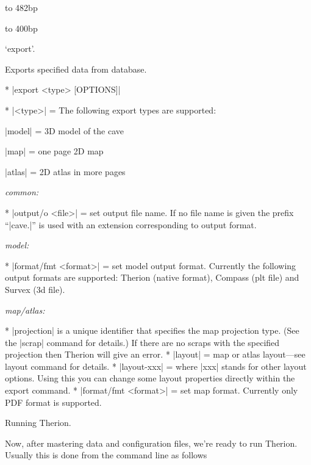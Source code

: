 \midinsert
  \ifx\pdfoutput\undefined\else
  \fi
  \vbox to 482bp{\centerline{\hbox to 400bp{%
    \ifx\pdfoutput\undefined
    \else
      \rlap{\pdfrefximage\pdflastximage}%
    \fi
    \hss}}\vss
  }
\endinsert


\subsubchapter `export'.

\description
  Exports specified data from database. 
\enddescription

\syntax
  \list
    * |export <type> [OPTIONS]| 
  \endlist
\endsyntax

\arguments
  * |<type>| = The following export types are supported:

    |model| = 3D model of the cave

    |map| = one page 2D map

    |atlas| = 2D atlas in more pages
\endarguments

\options
  {\it common:}

  * |output/o <file>| = set output file name. If no file name is
    given the prefix ``|cave.|'' is used with an extension corresponding to
    output format.

  {\it model:}

  * |format/fmt <format>| = set model output format. Currently the following
    output formats are supported: Therion (native format), Compass 
    (plt file) and Survex (3d file).

  {\it map/atlas:}
  
  * |projection| is a unique identifier that specifies the map projection type.
    (See the |scrap| command for details.) If there are no scraps with 
    the specified projection then Therion will give an error. 
  * |layout| = map or atlas layout---see layout command for details.
  * |layout-xxx| = where |xxx| stands for other layout options. Using this
    you can change some layout properties directly within the export command.
  * |format/fmt <format>| = set map format. Currently only PDF format
    is supported.
\endoptions



\subchapter Running Therion.

Now, after mastering data and configuration files, we're ready to run Therion. 
Usually this is done from the command line as follows

